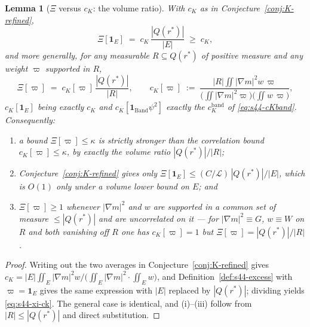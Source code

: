 \documentclass[11pt]{article}
\newtheorem{lemma}[theorem]{Lemma}
\theoremstyle{definition}
\theoremstyle{remark}
\begin{document}
\begin{lemma}[$\Xi$ versus $c_K$: the volume ratio]\label{lem:s44-xi-vs-cK}
  With $c_K$ as in Conjecture~\ref{conj:K-refined},
  \begin{equation}\label{eq:s44-xi-ck}
    \Xi[\mathbf{1}_E] \;=\; c_K\,\frac{|Q(r^*)|}{|E|}\;\geq\;c_K ,
  \end{equation}
  and more generally, for any measurable $R\subseteq Q(r^*)$ of positive
  measure and any weight $\varpi$ supported in $R$,
  \[
    \Xi[\varpi] \;=\; c_K[\varpi]\,\frac{|Q(r^*)|}{|R|},
    \qquad
    c_K[\varpi]\;:=\;
    \frac{|R|\iint|\nabla m|^2w\,\varpi}
      {\bigl(\iint|\nabla m|^2\varpi\bigr)\bigl(\iint w\,\varpi\bigr)} ,
  \]
  $c_K[\mathbf{1}_E]$ being exactly $c_K$ and
  $c_K[\mathbf{1}_{\mathrm{Band}}\psi^2]$ exactly the $c_K^{\mathrm{band}}$ of
  \eqref{eq:s44-cKband}. Consequently:
  \begin{enumerate}[label=(\roman*)]
    \item a bound $\Xi[\varpi]\leq\kappa$ is \emph{strictly stronger} than the
      correlation bound $c_K[\varpi]\leq\kappa$, by exactly the volume ratio
      $|Q(r^*)|/|R|$;
    \item Conjecture~\ref{conj:K-refined} gives only
      $\Xi[\mathbf{1}_E]\leq (C/\mathcal{L})\,|Q(r^*)|/|E|$, which is $O(1)$
      \emph{only} under a volume lower bound on $E$; and
    \item $\Xi[\varpi]\geq1$ whenever $|\nabla m|^2$ and $w$ are supported in a
      common set of measure $\leq|Q(r^*)|$ and are uncorrelated on it --- for
      $|\nabla m|^2\equiv G$, $w\equiv W$ on $R$ and both vanishing off $R$ one
      has $c_K[\varpi]=1$ but $\Xi[\varpi]=|Q(r^*)|/|R|$.
  \end{enumerate}
\end{lemma}
\begin{proof}
  Writing out the two averages in Conjecture~\ref{conj:K-refined} gives
  $c_K = |E|\iint_E|\nabla m|^2w
  \big/\bigl(\iint_E|\nabla m|^2\cdot\iint_E w\bigr)$, and
  Definition~\ref{def:s44-excess} with $\varpi=\mathbf{1}_E$ gives the same
  expression with $|E|$ replaced by $|Q(r^*)|$; dividing yields
  \eqref{eq:s44-xi-ck}. The general case is identical, and (i)--(iii) follow
  from $|R|\leq|Q(r^*)|$ and direct substitution.
\end{proof}
\end{document}
